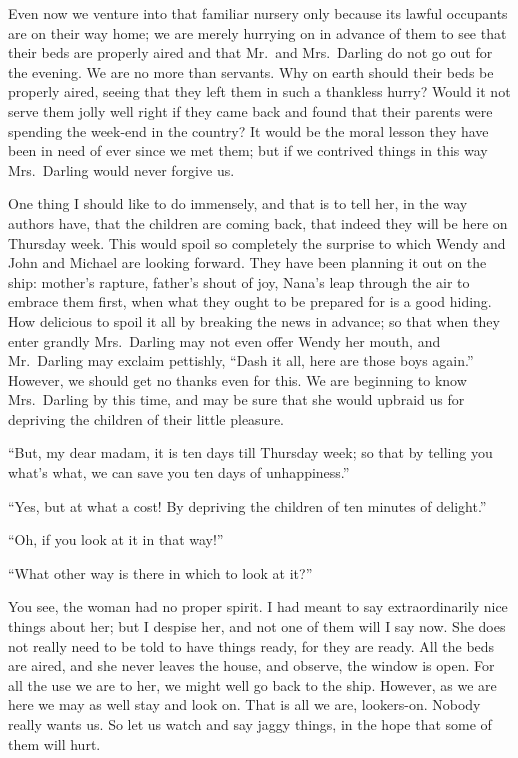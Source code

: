 Even now we venture into that familiar nursery only because its lawful
occupants are on their way home; we are merely hurrying on in advance
of them to see that their beds are properly aired and that Mr.\ and Mrs.\ Darling do not go out for the evening. We are no more than servants.
Why on earth should their beds be properly aired, seeing that they left
them in such a thankless hurry? Would it not serve them jolly well
right if they came back and found that their parents were spending the
week-end in the country? It would be the moral lesson they have been in
need of ever since we met them; but if we contrived things in this way
Mrs.\ Darling would never forgive us.

One thing I should like to do immensely, and that is to tell her, in
the way authors have, that the children are coming back, that indeed
they will be here on Thursday week. This would spoil so completely the
surprise to which Wendy and John and Michael are looking forward. They
have been planning it out on the ship: mother's rapture, father's shout
of joy, Nana's leap through the air to embrace them first, when what
they ought to be prepared for is a good hiding. How delicious to spoil
it all by breaking the news in advance; so that when they enter grandly
Mrs.\ Darling may not even offer Wendy her mouth, and Mr.\ Darling may
exclaim pettishly, ``Dash it all, here are those boys again.'' However,
we should get no thanks even for this. We are beginning to know Mrs.\ Darling by this time, and may be sure that she would upbraid us for
depriving the children of their little pleasure.

``But, my dear madam, it is ten days till Thursday week; so that by
telling you what's what, we can save you ten days of unhappiness.''

``Yes, but at what a cost! By depriving the children of ten minutes of
delight.''

``Oh, if you look at it in that way!''

``What other way is there in which to look at it?''

You see, the woman had no proper spirit. I had meant to say
extraordinarily nice things about her; but I despise her, and not one
of them will I say now. She does not really need to be told to have
things ready, for they are ready. All the beds are aired, and she never
leaves the house, and observe, the window is open. For all the use we
are to her, we might well go back to the ship. However, as we are here
we may as well stay and look on. That is all we are, lookers-on. Nobody
really wants us. So let us watch and say jaggy things, in the hope that
some of them will hurt.

